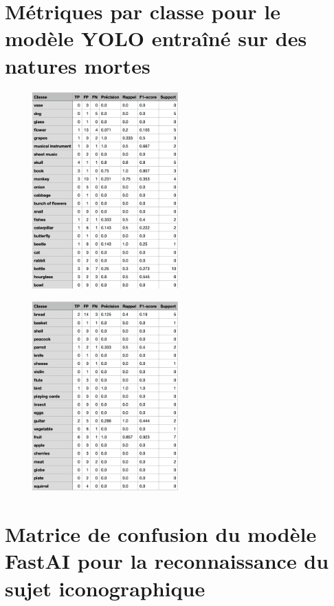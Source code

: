\section{Métriques par classe pour le modèle YOLO entraîné sur des natures mortes}

\begin{figure}[H]
    \centering
    \includegraphics[width=0.5\textwidth]{annexes/tables/metricsYOLO1.png}
    \label{fig:YOLO1}
\end{figure}

\begin{figure}[H]
    \centering
    \includegraphics[width=0.5\textwidth]{annexes/tables/metricsYOLO2.png}
    \label{fig:YOLO2}
\end{figure}

\section{Matrice de confusion du modèle FastAI pour la reconnaissance du sujet iconographique}

